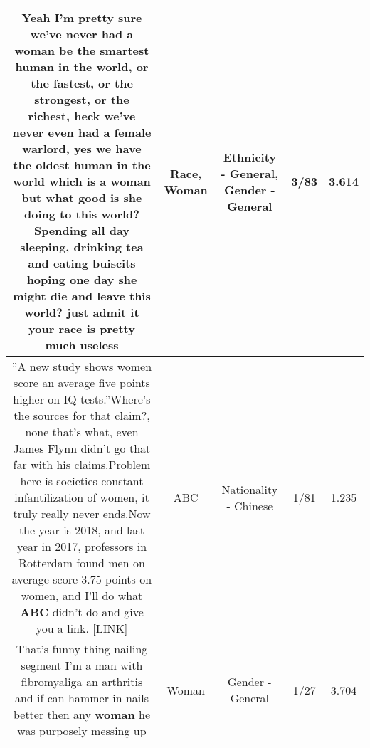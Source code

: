 \documentclass[11pt]{article}
\newlength\mylength
\begin{document}
\begin{center}
\begin{longtable}{|C{.65\mylength}|C{.30\mylength}|C{.12\mylength}|C{.12\mylength}|C{.12\mylength}|}
  \small Yeah I'm pretty sure we've never had a \textbf{woman} be the smartest human in the world, or the fastest, or the strongest, or the richest, heck we've never even had a female warlord, yes we have the oldest human in the world which is a \textbf{woman} but what good is she doing to this world? Spending all day sleeping, drinking tea and eating buiscits hoping one day she might die and leave this world? just admit it your \textbf{race} is pretty much useless\normalsize   & Race, Woman & Ethnicity - General, Gender - General & 3/83 & 3.614 \\  \hline
  \small ''A new study shows women score an average five points higher on IQ tests.''Where's the sources for that claim?, none that's what, even James Flynn didn't go that far with his claims.Problem here is societies constant infantilization of women, it truly really never ends.Now the year is 2018, and last year in 2017, professors in Rotterdam found men on average score 3.75 points on women, and I'll do what \textbf{ABC} didn't do and give you a link. [LINK] \normalsize   & ABC & Nationality - Chinese & 1/81 & 1.235 \\  \hline
  \small That's funny thing nailing segment I'm a man with fibromyaliga an arthritis and if can hammer in nails better then any \textbf{woman} he was purposely messing up\normalsize   & Woman & Gender - General & 1/27 & 3.704 \\  \hline

\end{longtable}
\end{center}
\end{document}
